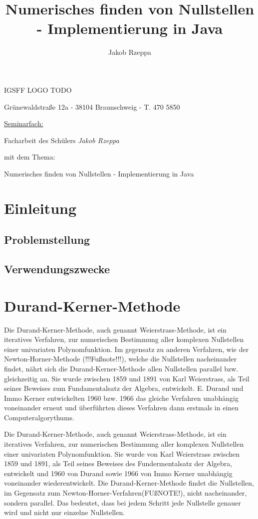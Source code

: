 \documentclass[12pt]{article}
\title{Numerisches finden von Nullstellen - Implementierung in Java}
\author{Jakob Rzeppa}
\begin{document}
\begin{titlepage}
	\centering
    {\huge IGSFF LOGO TODO\par}
	{Grünewaldstraße 12a - 38104 Braunschweig - T. 470 5850\par}
	\vspace{1cm}
	{\underline{Seminarfach:}\par}
	\vspace{1cm}
    {\large Facharbeit des Schülers \textit{Jakob Rzeppa} \par mit dem Thema: \par}
    \vspace{1.5cm}
	{\huge Numerisches finden von Nullstellen - Implementierung in Java\par}
	\vspace{2cm}
\end{titlepage}

\tableofcontents

\section{Einleitung}
    \subsection{Problemstellung}
    \subsection{Verwendungszwecke}

\section{Durand-Kerner-Methode}
Die Durand-Kerner-Methode, auch genannt Weierstrass-Methode, ist ein iteratives Verfahren, zur numerischen Bestimmung aller komplexen Nullstellen einer univariaten Polynomfunktion. Im gegensatz zu anderen Verfahren, wie der Newton-Horner-Methode (!!!Fußnote!!!), welche die Nullstellen nacheinander findet, nährt sich die Durand-Kerner-Methode allen Nullstellen parallel bzw. gleichzeitig an. Sie wurde zwischen 1859 und 1891 von Karl Weierstrass, als Teil seines Beweises zum Fundamentalsatz der Algebra, entwickelt. 
E. Durand und Immo Kerner entwickelten 1960 bzw. 1966 das gleiche Verfahren unabhängig voneinander erneut und überführten dieses Verfahren dann erstmals in einen Computeralgorythums.

Die Durand-Kerner-Methode, auch genannt Weierstrass-Methode, ist ein iteratives Verfahren, zur numerischen Bestimmung aller komplexen Nullstellen einer univariaten Polynomfunktion.
Sie wurde von Karl Weierstrass zwischen 1859 und 1891, als Teil seines Beweises des Fundermentalsatz der Algebra, entwickelt und 1960 von Durand sowie 1966 von Immo Kerner unabhängig voneinander wiederentwickelt.
Die Durand-Kerner-Methode findet die Nullstellen, im Gegensatz zum Newton-Horner-Verfahren(FUßNOTE!), nicht nacheinander, sondern parallel. Das bedeutet, dass bei jedem Schritt jede Nullstelle genauer wird und nicht nur einzelne Nullstellen.
\end{document}
